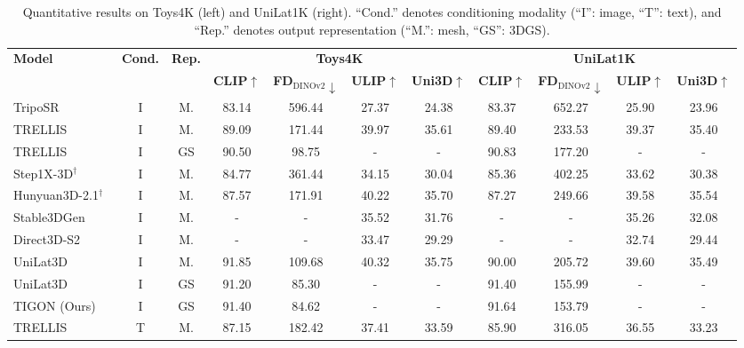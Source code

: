 \begin{table}[t]
\centering
\small
\caption{Quantitative results on Toys4K (left) and UniLat1K (right). ``Cond.'' denotes conditioning modality (``I'': image, ``T'': text), and ``Rep.'' denotes output representation (``M.'': mesh, ``GS'': 3DGS).}
\label{tab:toys4k}
\setlength{\tabcolsep}{5.6pt}
\begin{tabular}{lcc|cccc|cccc}
\toprule
\multirow{2}{*}{\textbf{Model}} & \multirow{2}{*}{\textbf{Cond.}} & \multirow{2}{*}{\textbf{Rep.}} &
\multicolumn{4}{c|}{\textbf{Toys4K}} &
\multicolumn{4}{c}{\textbf{UniLat1K}} \\
 & & &
\textbf{CLIP$\uparrow$} & \textbf{FD$_{\text{DINOv2}}\downarrow$} & \textbf{ULIP$\uparrow$} & \textbf{Uni3D$\uparrow$} &
\textbf{CLIP$\uparrow$} & \textbf{FD$_{\text{DINOv2}}\downarrow$} & \textbf{ULIP$\uparrow$} & \textbf{Uni3D$\uparrow$} \\
\midrule
TripoSR~\cite{triposr}                & I & M.  & 83.14 & 596.44 & 27.37 & 24.38 & 83.37 & 652.27 & 25.90 & 23.96 \\
TRELLIS                               & I & M.  & 89.09 & 171.44 & 39.97 & 35.61 & 89.40 & 233.53 & 39.37 & 35.40 \\
TRELLIS                               & I & GS  & 90.50 &  98.75 &   -   &   -   & 90.83 & 177.20 &   -   &   -   \\
Step1X-3D$^{\dagger}$~\cite{step1x}   & I & M.  & 84.77 & 361.44 & 34.15 & 30.04 & 85.36 & 402.25 & 33.62 & 30.38 \\
Hunyuan3D-2.1$^{\dagger}$~\cite{hunyuan3d2025hunyuan3d2.1} & I & M.  & 87.57 & 171.91 & 40.22 & 35.70 & 87.27 & 249.66 & 39.58 & 35.54 \\
Stable3DGen~\cite{ye2025hi3dgen}      & I & M.  &   -   &   -    & 35.52 & 31.76 &   -   &   -    & 35.26 & 32.08 \\
Direct3D-S2~\cite{direct3ds2}         & I & M.  &   -   &   -    & 33.47 & 29.29 &   -   &   -    & 32.74 & 29.44 \\
UniLat3D                              & I & M.  & 91.85 & 109.68 & 40.32 & 35.75 & 90.00 & 205.72 & 39.60 & 35.49 \\
UniLat3D                              & I & GS  & 91.20 &  85.30 &   -   &   -   & 91.40 & 155.99 &   -   &   -   \\
\rowcolor{rowgray} TIGON (Ours)       & I & GS  & 91.40 &  84.62 &   -   &   -   & 91.64 & 153.79 &   -   &   -   \\
\midrule
TRELLIS                               & T & M.  & 87.15 & 182.42 & 37.41 & 33.59 & 85.90 & 316.05 & 36.55 & 33.23 \\

\end{tabular}
\end{table}
